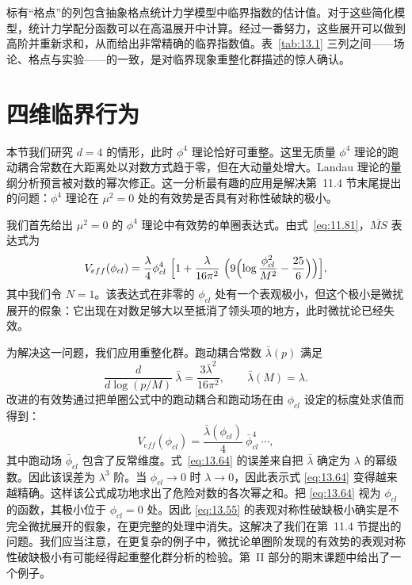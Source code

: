 标有``格点''的列包含抽象格点统计力学模型中临界指数的估计值。对于这些简化模型，统计力学配分函数可以在高温展开中计算。经过一番努力，这些展开可以做到高阶并重新求和，从而给出非常精确的临界指数值。表~\ref{tab:13.1} 三列之间——场论、格点与实验——的一致，是对临界现象重整化群描述的惊人确认。

\section{四维临界行为}

本节我们研究 $d = 4$ 的情形，此时 $\phi^4$ 理论恰好可重整。这里无质量 $\phi^4$ 理论的跑动耦合常数在大距离处以对数方式趋于零，但在大动量处增大。Landau 理论的量纲分析预言被对数的幂次修正。这一分析最有趣的应用是解决第~11.4 节末尾提出的问题：$\phi^4$ 理论在 $\mu^2 = 0$ 处的有效势是否具有对称性破缺的极小。

我们首先给出 $\mu^2 = 0$ 的 $\phi^4$ 理论中有效势的单圈表达式。由式~\eqref{eq:11.81}，$\overline{MS}$ 表达式为
\begin{equation}
  V_{eff}(\phi_{cl}) = \frac{\lambda}{4}\phi_{cl}^4\ \Bigl[ 1 +
    \frac{\lambda}{16\pi^2}\ \Bigl( 9\Bigl( \log\frac{\phi_{cl}^2}{M^2}
      - \frac{25}{6} \Bigr) \Bigr) \Bigr] ,
  \label{eq:13.55}
\end{equation}
其中我们令 $N = 1$。该表达式在非零的 $\phi_{cl}$ 处有一个表观极小，但这个极小是微扰展开的假象：它出现在对数足够大以至抵消了领头项的地方，此时微扰论已经失效。

为解决这一问题，我们应用重整化群。跑动耦合常数 $\bar{\lambda}(p)$ 满足
\begin{equation}
  \frac{d}{d\log(p/M)}\ \bar{\lambda} = \frac{3\bar{\lambda}^2}{16\pi^2},
  \qquad \bar{\lambda}(M) = \lambda .
\end{equation}
改进的有效势通过把单圈公式中的跑动耦合和跑动场在由 $\phi_{cl}$ 设定的标度处求值而得到：
\begin{equation}
  V_{eff}(\phi_{cl}) = \frac{\bar{\lambda}(\phi_{cl})}{4}\ \bar{\phi}_{cl}^4
    \ \cdots ,
  \label{eq:13.64}
\end{equation}
其中跑动场 $\bar{\phi}_{cl}$ 包含了反常维度。式~\eqref{eq:13.64} 的误差来自把 $\bar{\lambda}$ 确定为 $\lambda$ 的幂级数。因此该误差为 $\lambda^3$ 阶。当 $\phi_{cl}\to 0$ 时 $\lambda\to 0$，因此表示式 \eqref{eq:13.64} 变得越来越精确。这样该公式成功地求出了危险对数的各次幂之和。把 \eqref{eq:13.64} 视为 $\phi_{cl}$ 的函数，其极小位于 $\phi_{cl} = 0$ 处。因此 \eqref{eq:13.55} 的表观对称性破缺极小确实是不完全微扰展开的假象，在更完整的处理中消失。这解决了我们在第~11.4 节提出的问题。我们应当注意，在更复杂的例子中，微扰论单圈阶发现的有效势的表观对称性破缺极小有可能经得起重整化群分析的检验。第~II 部分的期末课题中给出了一个例子。

